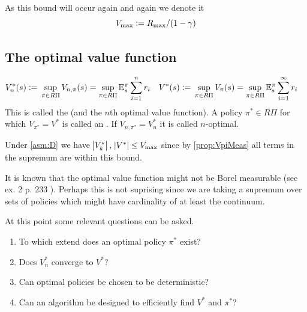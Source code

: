 \begin{rem}
  As this bound will occur again and again we denote it
  \begin{equation}
    V_{\max} \vcentcolon= R_{\max}/(1-\gamma)
    \label{eq:VmaxDef}
  \end{equation}
\end{rem}

\subsection{The optimal value function}

\begin{defn} 
  \begin{align*}
    V_n^*(s) \vcentcolon= & \; \sup_{\pi \in R\Pi} V_{n,\pi}(s)
    = \sup_{\pi \in R\Pi} \mathbb{E}_s^\pi \sum_{i=1}^n r_i
    &
    V^*(s) \vcentcolon= & \; \sup_{\pi \in R\Pi} V_\pi(s)
    = \sup_{\pi \in R\Pi} \mathbb{E}_s^\pi \sum_{i=1}^\infty r_i
  \end{align*}
  This is called the  (and the $n$th
  optimal value function).
  A policy $\pi^* \in R\Pi$ for which $V_{\pi^*} = V^*$ is called an
  .
  If $V_{n, \pi^*} = V^*_n$ it is called $n$-optimal.
  \label{defn:optimalValue}
\end{defn}

\begin{rem} Under \cref{asm:D} we have
  $\abs{V^*_k},\; \abs{V^*} \leq V_{\max}$ since by
  \cref{prop:VpiMeas} all terms in the supremum are within this bound.
\end{rem}

\begin{rem}
It is known that the optimal value function
might not be Borel measurable (see ex. 2 p. 233 ).
Perhaps this is not suprising since we are taking a supremum over
sets of policies which might have cardinality of at least the continuum.
\end{rem}

At this point some relevant questions can be asked.
\begin{enumerate}
  \item To which extend does an optimal policy $\pi^*$ exist?
  \item Does $V_n^*$ converge to $V^*$?
  \item Can optimal policies be chosen to be deterministic?
  \item Can an algorithm be designed to efficiently find $V^*$ and
    $\pi^*$?
\end{enumerate}

